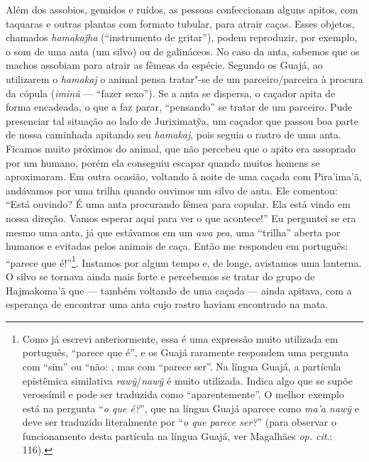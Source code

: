Além dos assobios, gemidos e ruídos, as pessoas confeccionam alguns
apitos, com taquaras e outras plantas com formato tubular, para atrair
caças. Esses objetos, chamados \emph{hamakajha} (``instrumento de
gritar''), podem reproduzir, por exemplo, o som de uma anta (um silvo) ou
de galináceos. No caso da anta, sabemos que os machos assobiam para
atrair as fêmeas da espécie. Segundo os Guajá, ao utilizarem o
\emph{hamakaj} o animal pensa tratar"-se de um parceiro/parceira à
procura da cópula (\emph{iminũ} --- ``fazer sexo''). Se a anta se dispersa,
o caçador apita de forma encadeada, o que a faz parar, ``pensando'' se
tratar de um parceiro. Pude presenciar tal situação ao lado de
Juriximatỹa, um caçador que passou boa parte de nossa caminhada apitando
seu \emph{hamakaj}, pois seguia o rastro de uma anta. Ficamos muito
próximos do animal, que não percebeu que o apito era assoprado por um
humano, porém ela conseguiu escapar quando muitos homens se aproximaram.
Em outra ocasião, voltando à noite de uma caçada com Pira'ima'ã,
andávamos por uma trilha quando ouvimos um silvo de anta. Ele comentou:
``Está ouvindo? É uma anta procurando fêmea para copular. Ela está vindo
 em nossa direção. Vamos esperar aqui para ver o que acontece!'' Eu
perguntei se era mesmo uma anta, já que estávamos em um \emph{awa}
\emph{pea}, uma ``trilha'' aberta por humanos e evitadas pelos animais de
caça. Então me respondeu em português: ``parece que é!''\footnote{Como já
  escrevi anteriormente, essa é uma expressão muito utilizada em
  português, ``parece que é'', e os Guajá raramente respondem uma pergunta
  com ``sim'' ou ``não: , mas com ``parece ser''. Na língua Guajá, a
  partícula epistêmica similativa \emph{rawỹ}/\emph{nawỹ} é muito
  utilizada. Indica algo que se supõe verossímil e pode ser traduzida
  como ``aparentemente''. O melhor exemplo está na pergunta ``\emph{o que
  é?}'', que na língua Guajá aparece como \emph{ma'a nawỹ} e deve ser
  traduzido literalmente por ``\emph{o que parece ser?}'' (para observar o
  funcionamento desta partícula na língua Guajá, ver Magalhães \emph{op. cit}.:
  116).}. Instamos por algum tempo e, de longe, avistamos uma lanterna.
O silvo se tornava ainda mais forte e percebemos se tratar do grupo de
Hajmakoma'ã que --- também voltando de uma caçada --- ainda apitava, com a
esperança de encontrar uma anta cujo rastro haviam encontrado na mata.

